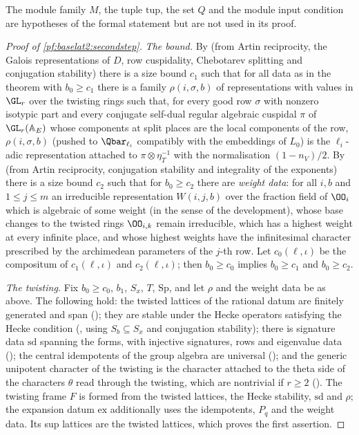 \begin{remark}
The module family $M$, the tuple $\mathrm{tup}$, the set $Q$ and the module input condition are hypotheses of the
formal statement but are not used in its proof.
\end{remark}

\begin{proof}[Proof of \cref{pf:baselat2:secondstep}]
\emph{The bound.} By  (from Artin reciprocity,
the Galois representations of $D$, row cuspidality, Chebotarev splitting and conjugation stability) there is
a size bound $c_1$ such that for all data as in the theorem with $b_0\ge c_1$ there is a family $\rho(i,\sigma,b)$
of representations with values in $\GL_r$ over the twisting rings such that, for every good row $\sigma$ with
nonzero isotypic part and every conjugate self-dual regular algebraic cuspidal $\pi$ of $\GL_r(\mathbb A_E)$
whose components at split places are the local components of the row, $\rho(i,\sigma,b)$ (pushed to $\Qbar_{\ell_i}$
compatibly with the embeddings of $L_0$) is the $\ell_i$-adic representation attached to $\pi\otimes\eta_T^{-1}$
with the normalisation $(1-n_V)/2$. By  (from Artin
reciprocity, conjugation stability and integrality of the exponents) there is a size bound $c_2$ such that
for $b_0\ge c_2$ there are \emph{weight data}: for all $i,b$ and $1\le j\le m$ an irreducible representation $W(i,j,b)$
over the fraction field of $\OO_i$ which is algebraic of some weight (in the sense of the development), whose base
changes to the twisted rings $\OO_{i,k}$ remain irreducible, which has a highest weight at every infinite place,
and whose highest weights have the infinitesimal character prescribed by the archimedean parameters of the
$j$-th row. Let
$c_0(\ell,\iota)$ be the compositum of $c_1(\ell,\iota)$ and $c_2(\ell,\iota)$; then $b_0\ge c_0$ implies $b_0\ge c_1$ and
$b_0\ge c_2$.

\emph{The twisting.} Fix $b_0\ge c_0$, $b_1$, $S_x$, $T$, $\mathrm{Sp}$, and let $\rho$ and the weight data be as
above. The following hold: the twisted lattices of the rational datum are finitely generated and span
(); they are stable under the Hecke
operators satisfying the Hecke condition (, using
$S_b\subseteq S_x$ and conjugation stability); there is signature data $\mathrm{sd}$ spanning the forms, with
injective signatures, rows and eigenvalue data ();
the central idempotents of the group algebra are universal
(); and the generic unipotent character
of the twisting is the character attached to the theta side of the characters $\theta$ read through the
twisting, which are nontrivial if $r\ge2$ (). The twisting frame $F$ is formed
from the twisted lattices, the Hecke stability, $\mathrm{sd}$ and $\rho$; the expansion datum $\mathrm{ex}$
additionally uses the idempotents, $P_q$ and the weight data. Its sup lattices are the twisted lattices,
which proves the first assertion.


\end{proof}
